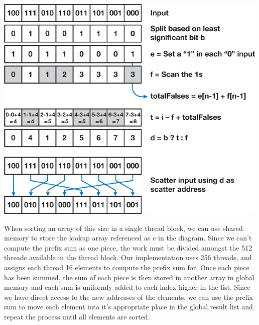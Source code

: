 \documentclass[12pt]{article}
\renewcommand{\indent}{\hspace{0.25in}}
\begin{document}
\begin{center}
\includegraphics[scale=0.5]{nvidia-stuff.jpg}
\end{center}

\indent When sorting an array of this size in a single thread block, we can use shared memory to store the lookup array referenced as $e$ in the diagram.  
Since we can't compute the prefix sum as one piece, the work must be divided amongst the 512 threads available in the thread block.  
Our implementation uses 256 threads, and assigns each thread 16 elements to compute the prefix sum for.  
Once each piece has been summed, the sum of each piece is then stored in another array in global memory and each sum is uniformly added to each index higher in the list.  
Since we have direct access to the new addresses of the elements, we can use the prefix sum to move each element into it's appropriate place in the global result list and repeat the process until all elements are sorted.
\end{document}

